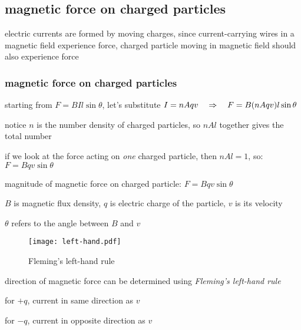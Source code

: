 






\subsection{magnetic force on charged particles}

electric currents are formed by moving charges, since current-carrying wires in a magnetic field experience force, charged particle moving in magnetic field should also experience force

\subsubsection{magnetic force on charged particles}

starting from $F=BIl\sin\theta$, let's substitute $I=nAqv \quad \Rightarrow \quad F=B(nAqv)l\sin\theta$

notice $n$ is the number density of charged particles, so $nAl$ together gives the total number

if we look at the force acting on \emph{one} charged particle, then $nAl=1$, so: $F=Bqv\sin\theta$

\cmt magnitude of magnetic force on charged particle: $\boxed{F=Bqv\sin\theta}$ 

$B$ is magnetic flux density, $q$ is electric charge of the particle, $v$ is its velocity

$\theta$ refers to the angle between $B$ and $v$

\begin{wrapfigure}{r}{0.45\textwidth}
	\vspace*{-16pt}
	\centering
	\texttt{[image: left-hand.pdf]}
	
	Fleming's left-hand rule
	\vspace*{-16pt}
\end{wrapfigure}

\cmt direction of magnetic force can be determined using \emph{Fleming's left-hand rule}

for $+q$, current in same direction as $v$

for $-q$, current in opposite direction as $v$

